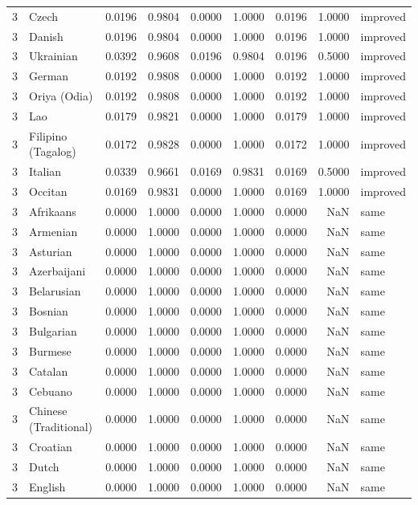 \begin{tabular}{rlrrrrrrl}
3 & Czech & 0.0196 & 0.9804 & 0.0000 & 1.0000 & 0.0196 & 1.0000 & improved \\
3 & Danish & 0.0196 & 0.9804 & 0.0000 & 1.0000 & 0.0196 & 1.0000 & improved \\
3 & Ukrainian & 0.0392 & 0.9608 & 0.0196 & 0.9804 & 0.0196 & 0.5000 & improved \\
3 & German & 0.0192 & 0.9808 & 0.0000 & 1.0000 & 0.0192 & 1.0000 & improved \\
3 & Oriya (Odia) & 0.0192 & 0.9808 & 0.0000 & 1.0000 & 0.0192 & 1.0000 & improved \\
3 & Lao & 0.0179 & 0.9821 & 0.0000 & 1.0000 & 0.0179 & 1.0000 & improved \\
3 & Filipino (Tagalog) & 0.0172 & 0.9828 & 0.0000 & 1.0000 & 0.0172 & 1.0000 & improved \\
3 & Italian & 0.0339 & 0.9661 & 0.0169 & 0.9831 & 0.0169 & 0.5000 & improved \\
3 & Occitan & 0.0169 & 0.9831 & 0.0000 & 1.0000 & 0.0169 & 1.0000 & improved \\
3 & Afrikaans & 0.0000 & 1.0000 & 0.0000 & 1.0000 & 0.0000 & NaN & same \\
3 & Armenian & 0.0000 & 1.0000 & 0.0000 & 1.0000 & 0.0000 & NaN & same \\
3 & Asturian & 0.0000 & 1.0000 & 0.0000 & 1.0000 & 0.0000 & NaN & same \\
3 & Azerbaijani & 0.0000 & 1.0000 & 0.0000 & 1.0000 & 0.0000 & NaN & same \\
3 & Belarusian & 0.0000 & 1.0000 & 0.0000 & 1.0000 & 0.0000 & NaN & same \\
3 & Bosnian & 0.0000 & 1.0000 & 0.0000 & 1.0000 & 0.0000 & NaN & same \\
3 & Bulgarian & 0.0000 & 1.0000 & 0.0000 & 1.0000 & 0.0000 & NaN & same \\
3 & Burmese & 0.0000 & 1.0000 & 0.0000 & 1.0000 & 0.0000 & NaN & same \\
3 & Catalan & 0.0000 & 1.0000 & 0.0000 & 1.0000 & 0.0000 & NaN & same \\
3 & Cebuano & 0.0000 & 1.0000 & 0.0000 & 1.0000 & 0.0000 & NaN & same \\
3 & Chinese (Traditional) & 0.0000 & 1.0000 & 0.0000 & 1.0000 & 0.0000 & NaN & same \\
3 & Croatian & 0.0000 & 1.0000 & 0.0000 & 1.0000 & 0.0000 & NaN & same \\
3 & Dutch & 0.0000 & 1.0000 & 0.0000 & 1.0000 & 0.0000 & NaN & same \\
3 & English & 0.0000 & 1.0000 & 0.0000 & 1.0000 & 0.0000 & NaN & same \\

\end{tabular}
